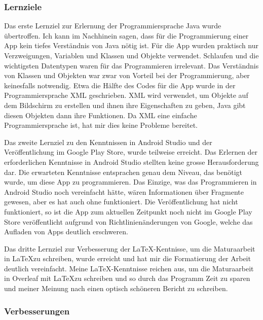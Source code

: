 \subsubsection{Lernziele}

Das erste Lernziel zur Erlernung der Programmiersprache Java wurde übertroffen. Ich kann im Nachhinein sagen, dass für die Programmierung einer App kein tiefes Verständnis von Java nötig ist. Für die App wurden praktisch nur Verzweigungen, Variablen und Klassen und Objekte verwendet. Schlaufen und die wichtigsten Datentypen waren für das Programmieren irrelevant. Das Verständnis von Klassen und Objekten war zwar von Vorteil bei der Programmierung, aber keinesfalls notwendig. Etwa die Hälfte des Codes für die App wurde in der Programmiersprache XML geschrieben. XML wird verwendet, um Objekte auf dem Bildschirm zu erstellen und ihnen ihre Eigenschaften zu geben, Java gibt diesen Objekten dann ihre Funktionen. Da XML eine einfache Programmiersprache ist, hat mir dies keine Probleme bereitet. \par
Das zweite Lernziel zu den Kenntnissen in Android Studio und der Veröffentlichung im Google Play Store, wurde teilweise erreicht. Das Erlernen der erforderlichen Kenntnisse in Android Studio stellten keine grosse Herausforderung dar. Die erwarteten Kenntnisse entsprachen genau dem Niveau, das benötigt wurde, um diese App zu programmieren. Das Einzige, was das Programmieren in Android Studio noch vereinfacht hätte, wären Informationen über Fragmente gewesen, aber es hat auch ohne funktioniert. Die Veröffentlichung hat nicht funktioniert, so ist die App zum aktuellen Zeitpunkt noch nicht im Google Play Store veröffentlicht aufgrund von Richtlinienänderungen von Google, welche das Aufladen von Apps deutlich erschweren. \par
Das dritte Lernziel zur Verbesserung der \LaTeX -Kentnisse, um die Maturaarbeit in \LaTeX zu schreiben, wurde erreicht und hat mir die Formatierung der Arbeit deutlich vereinfacht. Meine \LaTeX -Kenntnisse reichen aus, um die Maturaarbeit in Overleaf mit \LaTeX zu schreiben und so durch das Programm Zeit zu sparen und meiner Meinung nach einen optisch schöneren Bericht zu schreiben.

\subsubsection{Verbesserungen}

